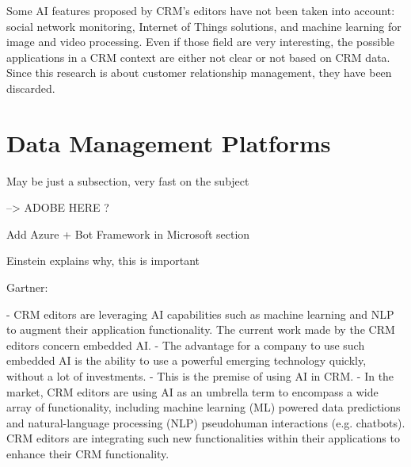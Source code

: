 Some AI features proposed by CRM's editors have not been taken into account: social network monitoring, Internet of Things solutions, and machine learning for image and video processing. Even if those field are very interesting, the possible applications in a CRM context are either not clear or not based on CRM data. Since this research is about customer relationship management, they have been discarded.


\section{Data Management Platforms}
May be just a subsection, very fast on the subject

--> ADOBE HERE ?

Add Azure + Bot Framework in Microsoft section

Einstein explains why, this is important

Gartner:

    - CRM editors are leveraging AI capabilities such as machine learning and NLP to augment their application functionality. The current work made by the CRM editors concern embedded AI.
    - The advantage for a company to use such embedded AI is the ability to use a powerful emerging technology quickly, without a lot of investments. 
    - This is the premise of using AI in CRM.
    - In the market, CRM editors are using AI as an umbrella term to encompass a wide array of functionality, including machine learning (ML) powered data predictions and natural-language processing (NLP) pseudohuman interactions (e.g. chatbots).  CRM editors are integrating such new functionalities within their applications to enhance their CRM functionality.


